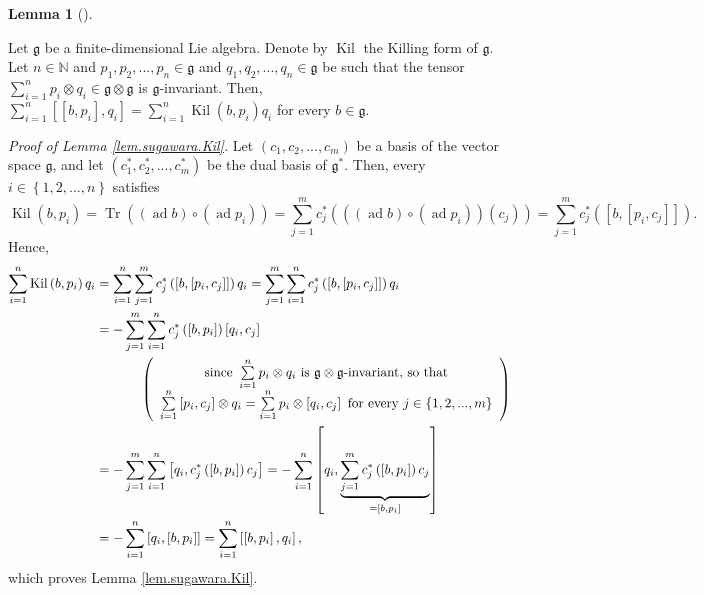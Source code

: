 \documentclass
[numbers=enddot,12pt,final,onecolumn,german,notitlepage]{scrartcl}%
\theoremstyle{definition}
\newtheorem{lem}[theo]{Lemma}
\newenvironment{lemma}[1][]
{\begin{lem}[#1]\begin{leftbar}}
{\end{leftbar}\end{lem}}
\begin{document}
\begin{lemma}
\label{lem.sugawara.Kil}Let $\mathfrak{g}$ be a finite-dimensional Lie
algebra. Denote by $\operatorname*{Kil}$ the Killing form of $\mathfrak{g}$.
Let $n\in\mathbb{N}$ and $p_{1},p_{2},...,p_{n}\in\mathfrak{g}$ and
$q_{1},q_{2},...,q_{n}\in\mathfrak{g}$ be such that the tensor $\sum
\limits_{i=1}^{n}p_{i}\otimes q_{i}\in\mathfrak{g}\otimes\mathfrak{g}$ is
$\mathfrak{g}$-invariant. Then, $\sum\limits_{i=1}^{n}\left[  \left[
b,p_{i}\right]  ,q_{i}\right]  =\sum\limits_{i=1}^{n}\operatorname*{Kil}%
\left(  b,p_{i}\right)  q_{i}$ for every $b\in\mathfrak{g}$.
\end{lemma}

\textit{Proof of Lemma \ref{lem.sugawara.Kil}.} Let $\left(  c_{1}%
,c_{2},...,c_{m}\right)  $ be a basis of the vector space $\mathfrak{g}$, and
let $\left(  c_{1}^{\ast},c_{2}^{\ast},...,c_{m}^{\ast}\right)  $ be the dual
basis of $\mathfrak{g}^{\ast}$. Then, every $i\in\left\{  1,2,...,n\right\}  $
satisfies
\[
\operatorname*{Kil}\left(  b,p_{i}\right)  =\operatorname*{Tr}\left(  \left(
\operatorname*{ad}b\right)  \circ\left(  \operatorname*{ad}p_{i}\right)
\right)  =\sum\limits_{j=1}^{m}c_{j}^{\ast}\left(  \left(  \left(
\operatorname*{ad}b\right)  \circ\left(  \operatorname*{ad}p_{i}\right)
\right)  \left(  c_{j}\right)  \right)  =\sum\limits_{j=1}^{m}c_{j}^{\ast
}\left(  \left[  b,\left[  p_{i},c_{j}\right]  \right]  \right)  .
\]
Hence,%
\begin{align*}
\sum\limits_{i=1}^{n}\operatorname*{Kil}\left(  b,p_{i}\right)  q_{i}  &
=\sum\limits_{i=1}^{n}\sum\limits_{j=1}^{m}c_{j}^{\ast}\left(  \left[
b,\left[  p_{i},c_{j}\right]  \right]  \right)  q_{i}=\sum\limits_{j=1}%
^{m}\sum\limits_{i=1}^{n}c_{j}^{\ast}\left(  \left[  b,\left[  p_{i}%
,c_{j}\right]  \right]  \right)  q_{i}\\
&  =-\sum\limits_{j=1}^{m}\sum\limits_{i=1}^{n}c_{j}^{\ast}\left(  \left[
b,p_{i}\right]  \right)  \left[  q_{i},c_{j}\right] \\
&  \ \ \ \ \ \ \ \ \ \ \left(
\begin{array}
[c]{c}%
\text{since }\sum\limits_{i=1}^{n}p_{i}\otimes q_{i}\text{ is }\mathfrak{g}%
\otimes\mathfrak{g}\text{-invariant, so that}\\
\sum\limits_{i=1}^{n}\left[  p_{i},c_{j}\right]  \otimes q_{i}=\sum
\limits_{i=1}^{n}p_{i}\otimes\left[  q_{i},c_{j}\right]  \text{ for every
}j\in\left\{  1,2,...,m\right\}
\end{array}
\right) \\
&  =-\sum\limits_{j=1}^{m}\sum\limits_{i=1}^{n}\left[  q_{i},c_{j}^{\ast
}\left(  \left[  b,p_{i}\right]  \right)  c_{j}\right]  =-\sum\limits_{i=1}%
^{n}\left[  q_{i},\underbrace{\sum\limits_{j=1}^{m}c_{j}^{\ast}\left(  \left[
b,p_{i}\right]  \right)  c_{j}}_{=\left[  b,p_{i}\right]  }\right] \\
&  =-\sum\limits_{i=1}^{n}\left[  q_{i},\left[  b,p_{i}\right]  \right]
=\sum\limits_{i=1}^{n}\left[  \left[  b,p_{i}\right]  ,q_{i}\right]  ,
\end{align*}
which proves Lemma \ref{lem.sugawara.Kil}.
\end{document}
